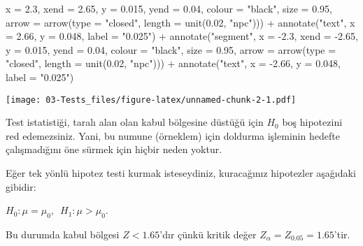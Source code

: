 \documentclass[
  12pt,
]{book}
\newenvironment{Shaded}{\begin{snugshade}}{\end{snugshade}}
\newcommand{\AttributeTok}[1]{\textcolor[rgb]{0.77,0.63,0.00}{#1}}
\newcommand{\FloatTok}[1]{\textcolor[rgb]{0.00,0.00,0.81}{#1}}
\newcommand{\FunctionTok}[1]{\textcolor[rgb]{0.00,0.00,0.00}{#1}}
\newcommand{\NormalTok}[1]{#1}
\newcommand{\SpecialCharTok}[1]{\textcolor[rgb]{0.00,0.00,0.00}{#1}}
\newcommand{\StringTok}[1]{\textcolor[rgb]{0.31,0.60,0.02}{#1}}
\begin{document}
\begin{Shaded}
\begin{Highlighting}[]
    \AttributeTok{x =} \FloatTok{2.3}\NormalTok{, }\AttributeTok{xend =} \FloatTok{2.65}\NormalTok{, }\AttributeTok{y =} \FloatTok{0.015}\NormalTok{, }\AttributeTok{yend =} \FloatTok{0.04}\NormalTok{, }\AttributeTok{colour =} \StringTok{"black"}\NormalTok{, }\AttributeTok{size =} \FloatTok{0.95}\NormalTok{, }
    \AttributeTok{arrow =} \FunctionTok{arrow}\NormalTok{(}\AttributeTok{type =} \StringTok{"closed"}\NormalTok{, }\AttributeTok{length =} \FunctionTok{unit}\NormalTok{(}\FloatTok{0.02}\NormalTok{, }\StringTok{"npc"}\NormalTok{))) }\SpecialCharTok{+} \FunctionTok{annotate}\NormalTok{(}\StringTok{"text"}\NormalTok{, }
    \AttributeTok{x =} \FloatTok{2.66}\NormalTok{, }\AttributeTok{y =} \FloatTok{0.048}\NormalTok{, }\AttributeTok{label =} \StringTok{"0.025"}\NormalTok{) }\SpecialCharTok{+} \FunctionTok{annotate}\NormalTok{(}\StringTok{"segment"}\NormalTok{, }\AttributeTok{x =} \SpecialCharTok{{-}}\FloatTok{2.3}\NormalTok{, }\AttributeTok{xend =} \SpecialCharTok{{-}}\FloatTok{2.65}\NormalTok{, }
    \AttributeTok{y =} \FloatTok{0.015}\NormalTok{, }\AttributeTok{yend =} \FloatTok{0.04}\NormalTok{, }\AttributeTok{colour =} \StringTok{"black"}\NormalTok{, }\AttributeTok{size =} \FloatTok{0.95}\NormalTok{, }\AttributeTok{arrow =} \FunctionTok{arrow}\NormalTok{(}\AttributeTok{type =} \StringTok{"closed"}\NormalTok{, }
        \AttributeTok{length =} \FunctionTok{unit}\NormalTok{(}\FloatTok{0.02}\NormalTok{, }\StringTok{"npc"}\NormalTok{))) }\SpecialCharTok{+} \FunctionTok{annotate}\NormalTok{(}\StringTok{"text"}\NormalTok{, }\AttributeTok{x =} \SpecialCharTok{{-}}\FloatTok{2.66}\NormalTok{, }\AttributeTok{y =} \FloatTok{0.048}\NormalTok{, }\AttributeTok{label =} \StringTok{"0.025"}\NormalTok{)}
\end{Highlighting}
\end{Shaded}

\texttt{[image: 03-Tests\_files/figure-latex/unnamed-chunk-2-1.pdf]}

Test istatistiği, taralı alan olan kabul bölgesine düstüğü için \(H_{0}\) boş hipotezini red edemezsiniz. Yani, bu numune (örneklem) için doldurma işleminin hedefte çalışmadığını öne sürmek için hiçbir neden yoktur.

Eğer tek yönlü hipotez testi kurmak isteseydiniz, kuracağınız hipotezler aşağıdaki gibidir:

\(H_{0}: \mu = \mu_{0},\,\,\, H_{1}: \mu > \mu_{0}\).

Bu durumda kabul bölgesi \(Z < 1.65\)'dır çünkü kritik değer \(Z_{\alpha} = Z_{0.05} = 1.65\)'tir.
\end{document}
